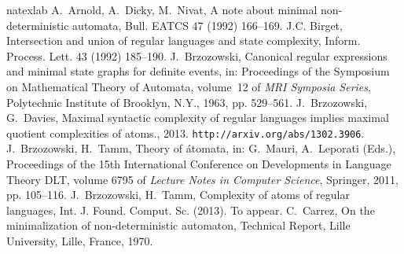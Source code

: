 \documentclass[preprint,12pt]{elsarticle}
\begin{document}
\begin{thebibliography}{16}
\expandafter\ifx\csname natexlab\endcsname\relax\def\natexlab#1{#1}\fi
\providecommand{\bibinfo}[2]{#2}
\ifx\xfnm\relax \def\xfnm[#1]{\unskip,\space#1}\fi
{}
\bibinfo{author}{A.~Arnold}, \bibinfo{author}{A.~Dicky},
  \bibinfo{author}{M.~Nivat}, \bibinfo{title}{A note about minimal
  non-deterministic automata}, \bibinfo{journal}{Bull. EATCS}
  \bibinfo{volume}{47} (\bibinfo{year}{1992}) \bibinfo{pages}{166--169}.
\bibinfo{author}{J.C. Birget}, \bibinfo{title}{Intersection and union of
  regular languages and state complexity}, \bibinfo{journal}{Inform. Process.
  Lett.} \bibinfo{volume}{43} (\bibinfo{year}{1992}) \bibinfo{pages}{185--190}.
\bibinfo{author}{J.~Brzozowski}, \bibinfo{title}{Canonical regular expressions
  and minimal state graphs for definite events}, in:
  \bibinfo{booktitle}{Proceedings of the Symposium on Mathematical Theory of
  Automata}, volume~\bibinfo{volume}{12} of \textit{\bibinfo{series}{MRI
  Symposia Series}}, \bibinfo{publisher}{Polytechnic Institute of Brooklyn,
  N.Y.}, \bibinfo{year}{1963}, pp. \bibinfo{pages}{529--561}.
\bibinfo{author}{J.~Brzozowski}, \bibinfo{author}{G.~Davies},
  \bibinfo{title}{Maximal syntactic complexity of regular languages implies
  maximal quotient complexities of atoms.}, \bibinfo{year}{2013}.
  \bibinfo{note}{{\tt http://arxiv.org/abs/1302.3906}}.
\bibinfo{author}{J.~Brzozowski}, \bibinfo{author}{H.~Tamm},
  \bibinfo{title}{Theory of \'atomata}, in: \bibinfo{editor}{G.~Mauri},
  \bibinfo{editor}{A.~Leporati} (Eds.), \bibinfo{booktitle}{Proceedings of the
  15th International Conference on Developments in Language Theory
  DLT\/}, volume \bibinfo{volume}{6795} of
  \textit{\bibinfo{series}{Lecture Notes in Computer Science}},
  \bibinfo{publisher}{Springer}, \bibinfo{year}{2011}, pp.
  \bibinfo{pages}{105--116}.
\bibinfo{author}{J.~Brzozowski}, \bibinfo{author}{H.~Tamm},
  \bibinfo{title}{Complexity of atoms of regular languages},
  \bibinfo{journal}{Int. J. Found. Comput. Sc.}  (\bibinfo{year}{2013}).
  \bibinfo{note}{To appear}.
\bibinfo{author}{C.~Carrez}, \bibinfo{title}{On the minimalization of
  non-deterministic automaton}, \bibinfo{type}{Technical Report}, Lille
  University, \bibinfo{address}{Lille, France}, \bibinfo{year}{1970}.

\end{thebibliography}
\end{document}
